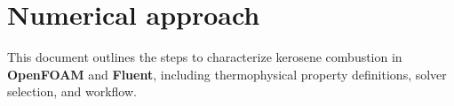 \documentclass[12pt]{article}
\begin{document}
%
%

\section{Numerical approach}\label{sec"sim}
This document outlines the steps to characterize kerosene combustion in \textbf{OpenFOAM} and \textbf{Fluent}, including thermophysical property definitions, solver selection, and workflow.
\end{document}
